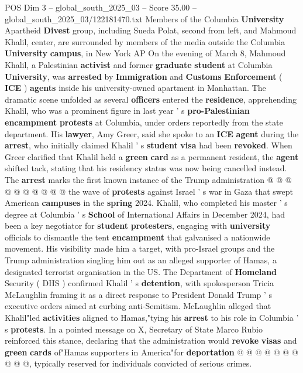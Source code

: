 \begin{textsample}{POS Dim 3 – global\_south\_2025\_03 – Score 35.00 – global\_south\_2025\_03/122181470.txt}  \label{ex:f3_pos_031}
Members of the Columbia \textbf{University} Apartheid \textbf{Divest} group, including Sueda Polat, second from left, and Mahmoud Khalil, center, are surrounded by members of the media outside the Columbia \textbf{University} \textbf{campus}, in New York AP On the evening of March 8, Mahmoud Khalil, a Palestinian \textbf{activist} and former \textbf{graduate} \textbf{student} at Columbia \textbf{University}, was \textbf{arrested} by \textbf{Immigration} and \textbf{Customs} \textbf{Enforcement} ( \textbf{ICE} ) \textbf{agents} inside his university-owned apartment in Manhattan.
The dramatic scene unfolded as several \textbf{officers} entered the \textbf{residence}, apprehending Khalil, who was a prominent figure in last year ' s \textbf{pro-Palestinian} \textbf{encampment} \textbf{protests} at Columbia, under orders reportedly from the state department.
His \textbf{lawyer}, Amy Greer, said she spoke to an \textbf{ICE} \textbf{agent} during the \textbf{arrest}, who initially claimed Khalil ' s \textbf{student} \textbf{visa} had been \textbf{revoked}.
When Greer clarified that Khalil held a \textbf{green} \textbf{card} as a permanent resident, the \textbf{agent} shifted tack, stating that his residency status was now being cancelled instead.
The \textbf{arrest} marks the first known instance of the Trump administration @ @ @ @ @ @ @ @ @ @ the wave of \textbf{protests} against Israel ' s war in Gaza that swept American \textbf{campuses} in the \textbf{spring} 2024.
Khalil, who completed his master ' s degree at Columbia ' s \textbf{School} of International Affairs in December 2024, had been a key negotiator for \textbf{student} \textbf{protesters}, engaging with \textbf{university} officials to dismantle the tent \textbf{encampment} that galvanised a nationwide movement.
His visibility made him a target, with pro-Israel groups and the Trump administration singling him out as an alleged supporter of Hamas, a designated terrorist organisation in the US.
The Department of \textbf{Homeland} Security ( DHS ) confirmed Khalil ' s \textbf{detention}, with spokesperson Tricia McLaughlin framing it as a direct response to President Donald Trump ' s executive orders aimed at curbing anti-Semitism.
McLaughlin alleged that Khalil"led \textbf{activities} aligned to Hamas,"tying his \textbf{arrest} to his role in Columbia ' s \textbf{protests}.
In a pointed message on X, Secretary of State Marco Rubio reinforced this stance, declaring that the administration would \textbf{revoke} \textbf{visas} and \textbf{green} \textbf{cards} of"Hamas supporters in America"for \textbf{deportation} @ @ @ @ @ @ @ @ @ @, typically reserved for individuals convicted of serious crimes.

\end{textsample}
